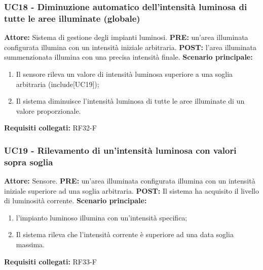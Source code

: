 \documentclass[a4paper, 12pt]{article}
\begin{document}
\subsubsection{UC18 - Diminuzione automatico dell'intensità luminosa di tutte le aree illuminate (globale)}
\textbf{Attore:} Sistema di gestione degli impianti luminosi.\newline
\textbf{PRE:} un'area illuminata configurata illumina con un intensità iniziale arbitraria.\newline
\textbf{POST:} l'area illuminata summenzionata illumina con una precisa intensità finale.\newline
\textbf{Scenario principale:}
\begin{enumerate}
    \item Il sensore rileva un valore di intensità luminosa superiore a una soglia arbitraria (include[UC19]);
    \item Il sistema diminuisce l’intensità luminosa di tutte le aree illuminate di un valore proporzionale.
\end{enumerate}
\textbf{Requisiti collegati:} RF32-F\newline

\subsubsection{UC19 - Rilevamento di un'intensità luminosa con valori sopra soglia}
\textbf{Attore:} Sensore.\newline
\textbf{PRE:} un'area illuminata configurata illumina con un intensità iniziale superiore ad una soglia arbitraria.\newline
\textbf{POST:} Il sistema ha acquisito il livello di luminosità corrente. \newline
\textbf{Scenario principale:}
\begin{enumerate}
    \item l'impianto luminoso illumina con un'intensità specifica;
    \item Il sistema rileva che l'intensità corrente è superiore ad una data soglia massima.
\end{enumerate}
\textbf{Requisiti collegati:} RF33-F\newline
\end{document}
